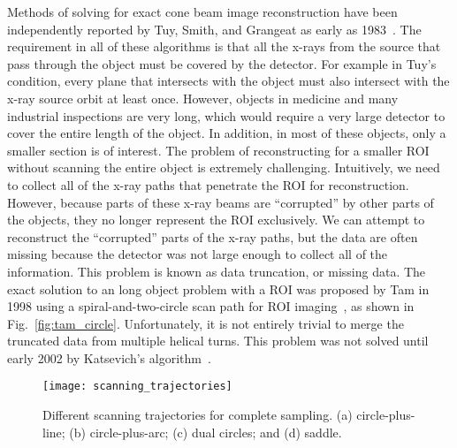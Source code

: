 Methods of solving for exact cone beam image reconstruction have been independently reported by Tuy, Smith, and Grangeat as early as 1983~\citep{Tuy1983, Smith1985, Grangeat1991}.  The requirement in all of these algorithms is that all the x-rays from the source that pass through the object must be covered by the detector.  For example in Tuy's condition, every plane that intersects with the object must also intersect with the x-ray source orbit at least once.  However, objects in medicine and many industrial inspections are very long, which would require a very large detector to cover the entire length of the object.  In addition, in most of these objects, only a smaller section is of interest.  The problem of reconstructing for a smaller ROI without scanning the entire object is extremely challenging.  Intuitively, we need to collect all of the x-ray paths that penetrate the ROI for reconstruction.  However, because parts of these x-ray beams are ``corrupted'' by other parts of the objects, they no longer represent the ROI exclusively.  We can attempt to reconstruct the ``corrupted'' parts of the x-ray paths, but the data are often missing because the detector was not large enough to collect all of the information.  This problem is known as data truncation, or missing data.  The exact solution to an long object problem with a ROI was proposed by Tam in 1998 using a spiral-and-two-circle scan path for ROI imaging~\citep{Tam1998}, as shown in Fig.~\ref{fig:tam_circle}.  Unfortunately, it is not entirely trivial to merge the truncated data from multiple helical turns.  This problem was not solved until early 2002 by Katsevich's algorithm~\citep{Katsevich2002SIAM, Katsevich2003, Katsevich2004}.
%
%
\begin{figure}[h]
\texttt{[image: scanning\_trajectories]}
\caption{Different scanning trajectories for complete sampling. (a) circle-plus-line; (b) circle-plus-arc; (c) dual circles; and (d) saddle.}
\label{fig:scanning_trajectories}
\end{figure}


